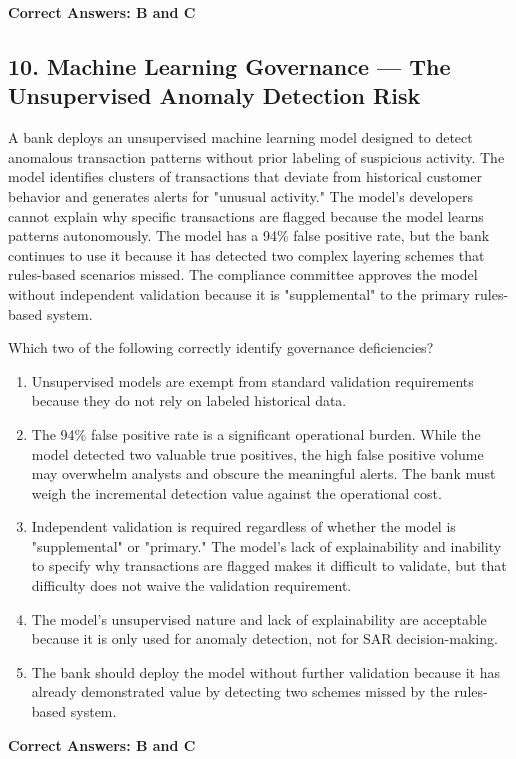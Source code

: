 \documentclass[11pt,a4paper]{article}
\begin{document}
	\textbf{Correct Answers: B and C}
	
	\subsection{10. Machine Learning Governance — The Unsupervised Anomaly Detection Risk}
	
	A bank deploys an unsupervised machine learning model designed to detect anomalous transaction patterns without prior labeling of suspicious activity. The model identifies clusters of transactions that deviate from historical customer behavior and generates alerts for "unusual activity." The model's developers cannot explain why specific transactions are flagged because the model learns patterns autonomously. The model has a 94\% false positive rate, but the bank continues to use it because it has detected two complex layering schemes that rules-based scenarios missed. The compliance committee approves the model without independent validation because it is "supplemental" to the primary rules-based system.
	
	Which two of the following correctly identify governance deficiencies?
	
	\begin{enumerate}[label=\Alph*.]
		\item Unsupervised models are exempt from standard validation requirements because they do not rely on labeled historical data.
		\item The 94\% false positive rate is a significant operational burden. While the model detected two valuable true positives, the high false positive volume may overwhelm analysts and obscure the meaningful alerts. The bank must weigh the incremental detection value against the operational cost.
		\item Independent validation is required regardless of whether the model is "supplemental" or "primary." The model's lack of explainability and inability to specify why transactions are flagged makes it difficult to validate, but that difficulty does not waive the validation requirement.
		\item The model's unsupervised nature and lack of explainability are acceptable because it is only used for anomaly detection, not for SAR decision-making.
		\item The bank should deploy the model without further validation because it has already demonstrated value by detecting two schemes missed by the rules-based system.
	\end{enumerate}
	
	\textbf{Correct Answers: B and C}
	
\end{document}
